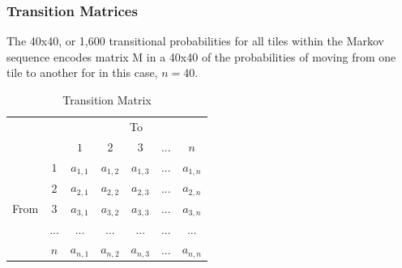 \documentclass[12pt]{article}
\begin{document}
\subsubsection{Transition Matrices}
The 40x40, or 1,600 transitional probabilities for all tiles within the Markov sequence encodes matrix M in a 40x40 of the probabilities of moving from one tile to another for in this case, $n=40$.
\begin{table}[h]
\centering
\label{Transition Matrix}
\begin{tabular}{ccccccc}
                                           &                        & \multicolumn{5}{c}{To}                                                                                                     \\ \cline{3-7} 
                                           & \multicolumn{1}{c|}{}  & \multicolumn{1}{c|}{$1$} & \multicolumn{1}{c|}{$2$} & \multicolumn{1}{c|}{$3$} & \multicolumn{1}{c|}{...} & \multicolumn{1}{c|}{$n$} \\ \cline{2-7} 
\multicolumn{1}{c|}{\multirow{5}{*}{From}} & \multicolumn{1}{c|}{$1$} & \multicolumn{1}{c|}{$a_{1,1}$}  & \multicolumn{1}{c|}{$a_{1,2}$}  & \multicolumn{1}{c|}{$a_{1,3}$}  & \multicolumn{1}{c|}{...}  & \multicolumn{1}{c|}{$a_{1,n}$}  \\ \cline{2-7} 
\multicolumn{1}{c|}{}                      & \multicolumn{1}{c|}{$2$} & \multicolumn{1}{c|}{$a_{2,1}$}  & \multicolumn{1}{c|}{$a_{2,2}$}  & \multicolumn{1}{c|}{$a_{2,3}$}  & \multicolumn{1}{c|}{...}  & \multicolumn{1}{c|}{$a_{2,n}$}  \\ \cline{2-7} 
\multicolumn{1}{c|}{}                      & \multicolumn{1}{c|}{$3$} & \multicolumn{1}{c|}{$a_{3,1}$}  & \multicolumn{1}{c|}{$a_{3,2}$}  & \multicolumn{1}{c|}{$a_{3,3}$}  & \multicolumn{1}{c|}{...}  & \multicolumn{1}{c|}{$a_{3,n}$}  \\ \cline{2-7} 
\multicolumn{1}{c|}{}                      & \multicolumn{1}{c|}{...} & \multicolumn{1}{c|}{...}  & \multicolumn{1}{c|}{...}  & \multicolumn{1}{c|}{...}  & \multicolumn{1}{c|}{...}  & \multicolumn{1}{c|}{...}  \\ \cline{2-7} 
\multicolumn{1}{c|}{}                      & \multicolumn{1}{c|}{$n$} & \multicolumn{1}{c|}{$a_{n,1}$}  & \multicolumn{1}{c|}{$a_{n,2}$}  & \multicolumn{1}{c|}{$a_{n,3}$}  & \multicolumn{1}{c|}{...}  & \multicolumn{1}{c|}{$a_{n,n}$}  \\ \cline{2-7} 
\end{tabular}
\caption{Transition Matrix}
\end{table}
\end{document}
